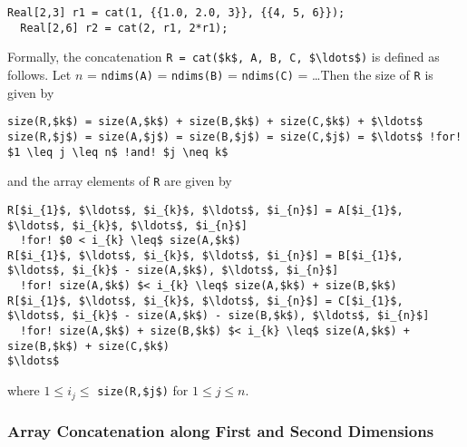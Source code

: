\begin{example}
\begin{lstlisting}[language=modelica]
  Real[2,3] r1 = cat(1, {{1.0, 2.0, 3}}, {{4, 5, 6}});
  Real[2,6] r2 = cat(2, r1, 2*r1);
\end{lstlisting}
\end{example}

Formally, the concatenation \lstinline[mathescape=true]!R = cat($k$, A, B, C, $\ldots$)! is defined as follows.  Let $n$ = \lstinline!ndims(A)! = \lstinline!ndims(B)! = \lstinline!ndims(C)! = \ldots  Then the size of \lstinline!R! is given by
\begin{lstlisting}[language=modelica,escapechar=!,mathescape=true,frame=none,xleftmargin=1em]
size(R,$k$) = size(A,$k$) + size(B,$k$) + size(C,$k$) + $\ldots$
size(R,$j$) = size(A,$j$) = size(B,$j$) = size(C,$j$) = $\ldots$ !for! $1 \leq j \leq n$ !and! $j \neq k$
\end{lstlisting}
and the array elements of \lstinline!R! are given by
\begin{lstlisting}[language=modelica,escapechar=!,mathescape=true,frame=none,xleftmargin=1em]
R[$i_{1}$, $\ldots$, $i_{k}$, $\ldots$, $i_{n}$] = A[$i_{1}$, $\ldots$, $i_{k}$, $\ldots$, $i_{n}$]
  !for! $0 < i_{k} \leq$ size(A,$k$)
R[$i_{1}$, $\ldots$, $i_{k}$, $\ldots$, $i_{n}$] = B[$i_{1}$, $\ldots$, $i_{k}$ - size(A,$k$), $\ldots$, $i_{n}$]
  !for! size(A,$k$) $< i_{k} \leq$ size(A,$k$) + size(B,$k$)
R[$i_{1}$, $\ldots$, $i_{k}$, $\ldots$, $i_{n}$] = C[$i_{1}$, $\ldots$, $i_{k}$ - size(A,$k$) - size(B,$k$), $\ldots$, $i_{n}$]
  !for! size(A,$k$) + size(B,$k$) $< i_{k} \leq$ size(A,$k$) + size(B,$k$) + size(C,$k$)
$\ldots$
\end{lstlisting}
where $1 \leq i_{j} \leq$ \lstinline[mathescape=true]!size(R,$j$)! for $1 \leq j \leq n$.


\subsubsection{Array Concatenation along First and Second Dimensions}

